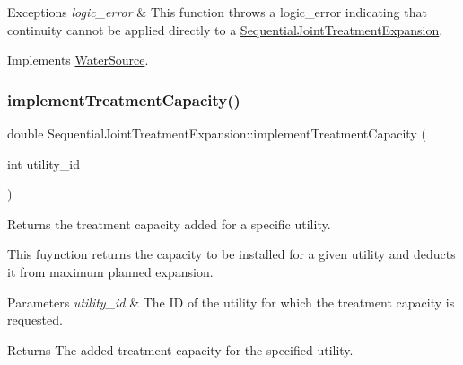 \begin{DoxyExceptions}{Exceptions}
{\em logic\+\_\+error} & This function throws a {\ttfamily logic\+\_\+error} indicating that continuity cannot be applied directly to a {\ttfamily \mbox{\hyperlink{classSequentialJointTreatmentExpansion}{Sequential\+Joint\+Treatment\+Expansion}}}. \\
\hline
\end{DoxyExceptions}


Implements \mbox{\hyperlink{classWaterSource_ac070445379fe706f65b977dade4f3fbc}{Water\+Source}}.

\mbox{\label{classSequentialJointTreatmentExpansion_a06a2e9479bd639661cd8241e571c5711}} 
\subsubsection{\texorpdfstring{implement\+Treatment\+Capacity()}{implementTreatmentCapacity()}}
{\footnotesize\ttfamily double Sequential\+Joint\+Treatment\+Expansion\+::implement\+Treatment\+Capacity (\begin{DoxyParamCaption}\item[{int}]{utility\+\_\+id }\end{DoxyParamCaption})}



Returns the treatment capacity added for a specific utility. 

This fuynction returns the capacity to be installed for a given utility and deducts it from maximum planned expansion.


\begin{DoxyParams}{Parameters}
{\em utility\+\_\+id} & The ID of the utility for which the treatment capacity is requested.\\
\hline
\end{DoxyParams}
\begin{DoxyReturn}{Returns}
The added treatment capacity for the specified utility. 
\end{DoxyReturn}
\mbox{\label{classSequentialJointTreatmentExpansion_a8e09c31e292155c17d0d670aaf767862}} 
